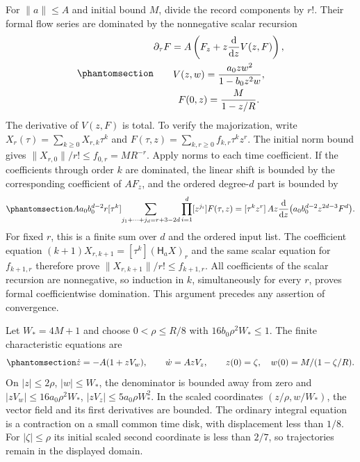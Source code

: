 \documentclass[
  english,
  11pt,
  reqno]{amsart}
\begin{document}
For \(\|a\|\le A\) and initial bound \(M\), divide the record components
by \(r!\). Their formal flow series are dominated by the nonnegative
scalar recursion
\begin{equation}\protect\phantomsection\label{eq:gg-flow-majorant}{\begin{gathered}
\partial_\tau F
  =A\left(F_z+z\frac{\mathrm d}{\mathrm dz}V(z,F)\right), \\
V(z,w)=\frac{a_0zw^2}{1-b_0z^2w}, \\
F(0,z)=\frac M{1-z/R}.
\end{gathered}}\end{equation} The derivative of \(V(z,F)\) is total. To verify the
majorization, write \(X_r(\tau)=\sum_{k\ge0}X_{r,k}\tau^k\) and
\(F(\tau,z)=\sum_{k,r\ge0}f_{k,r}\tau^kz^r\). The initial norm bound
gives \(\|X_{r,0}\|/r!\le f_{0,r}=MR^{-r}\). Apply norms to each time
coefficient. If the coefficients through order \(k\) are dominated, the
linear shift is bounded by the corresponding coefficient of \(AF_z\),
and the ordered degree-\(d\) part is bounded by
\begin{equation}\protect\phantomsection\label{eq:gg-flow-coefficient-majorization}{
 A a_0b_0^{d-2}r
 [\tau^k]\!
 \sum_{j_1+\cdots+j_d=r+3-2d}
       \prod_{i=1}^d[ z^{j_i}]F(\tau,z)
 = [\tau^kz^r]\,A z\frac{\mathrm d}{\mathrm dz}
       \bigl(a_0b_0^{d-2}z^{2d-3}F^d\bigr).
}\end{equation} For fixed \(r\), this is a finite sum over \(d\) and the
ordered input list. The coefficient equation
\((k+1)X_{r,k+1}=[\tau^k](\mathsf H_aX)_r\) and the same scalar equation
for \(f_{k+1,r}\) therefore prove \(\|X_{r,k+1}\|/r!\le f_{k+1,r}\). All
coefficients of the scalar recursion are nonnegative, so induction in
\(k\), simultaneously for every \(r\), proves formal coefficientwise
domination. This argument precedes any assertion of convergence.

Let \(W_*=4M+1\) and choose \(0<\rho\le R/8\) with
\(16b_0\rho^2W_*\le1\). The finite characteristic equations are
\begin{equation}\protect\phantomsection\label{eq:gg-majorant-characteristics}{
 \dot z=-A(1+zV_w),\qquad
 \dot w=AzV_z,\qquad
 z(0)=\zeta,\quad w(0)=M/(1-\zeta/R).
}\end{equation} On \(|z|\le2\rho\), \(|w|\le W_*\), the denominator is
bounded away from zero and \(|zV_w|\le16a_0\rho^2W_*\),
\(|zV_z|\le5a_0\rho W_*^2\). In the scaled coordinates
\((z/\rho,w/W_*)\), the vector field and its first derivatives are
bounded. The ordinary integral equation is a contraction on a small
common time disk, with displacement less than \(1/8\). For
\(|\zeta|\le\rho\) its initial scaled second coordinate is less than
\(2/7\), so trajectories remain in the displayed domain.
\end{document}
